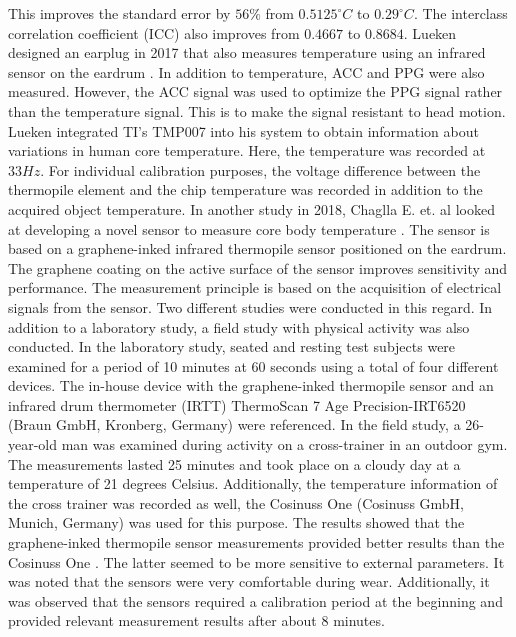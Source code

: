 This improves the standard error by $56\%$ from $0.5125 ^\circ C$ to $0.29 ^\circ C$. The interclass correlation coefficient (ICC) also improves from $0.4667$ to $0.8684$.
Lueken designed an earplug in 2017 that also measures temperature using an infrared sensor on the eardrum \cite{luekenPhotoplethysmographybasedInearSensor2017}.
In addition to temperature, ACC and PPG were also measured.
However, the ACC signal was used to optimize the PPG signal rather than the temperature signal. 
This is to make the signal resistant to head motion.
Lueken integrated TI's TMP007 into his system to obtain information about variations in human core temperature. 
Here, the temperature was recorded at $33 Hz$.
For individual calibration purposes, the voltage difference between the thermopile element and the chip temperature was recorded in addition to the acquired object temperature.
In another study in 2018, Chaglla E. et. al looked at developing a novel sensor to measure core body temperature \cite{chagllae.MeasurementCoreBody2018}. 
The sensor is based on a graphene-inked infrared thermopile sensor positioned on the eardrum. 
The graphene coating on the active surface of the sensor improves sensitivity and performance. 
The measurement principle is based on the acquisition of electrical signals from the sensor.
Two different studies were conducted in this regard. 
In addition to a laboratory study, a field study with physical activity was also conducted.
In the laboratory study, seated and resting test subjects were examined for a period of 10 minutes at 60 seconds using a total of four different devices. 
The in-house device with the graphene-inked thermopile sensor and an infrared drum thermometer (IRTT) ThermoScan 7 Age Precision-IRT6520 (Braun GmbH, Kronberg, Germany) were referenced.
In the field study, a 26-year-old man was examined during activity on a cross-trainer in an outdoor gym. The measurements lasted 25 minutes and took place on a cloudy day at a temperature of 21 degrees Celsius. 
Additionally, the temperature information of the cross trainer was recorded as well, the Cosinuss One (Cosinuss GmbH, Munich, Germany) was used for this purpose.
The results showed that the graphene-inked thermopile sensor measurements provided better results than the Cosinuss One \cite{chagllae.MeasurementCoreBody2018}. 
The latter seemed to be more sensitive to external parameters. 
It was noted that the sensors were very comfortable during wear. 
Additionally, it was observed that the sensors required a calibration period at the beginning and provided relevant measurement results after about 8 minutes. 
